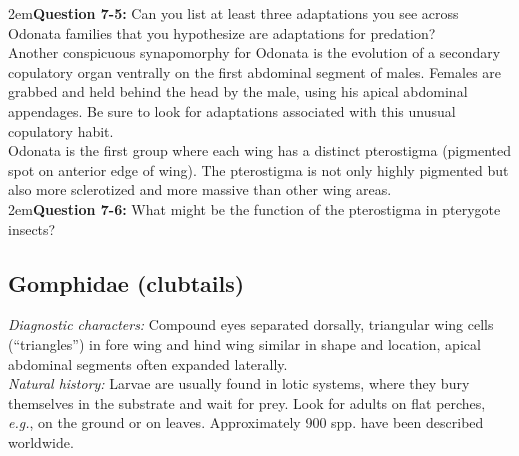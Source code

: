 \documentclass[letterpaper, 11pt]{article}
\begin{document}
\hangindent2em\textbf{Question 7-5:} Can you list at least three adaptations you see across Odonata families that you hypothesize are adaptations for predation?\\

\noindent{}Another conspicuous synapomorphy for Odonata is the evolution of a secondary copulatory organ ventrally on the first abdominal segment of males. Females are grabbed and held behind the head by the male, using his apical abdominal appendages. Be sure to look for adaptations associated with this unusual copulatory habit.\\

\noindent{}Odonata is the first group where each wing has a distinct pterostigma (pigmented spot on anterior edge of wing). The pterostigma is not only highly pigmented but also more sclerotized and more massive than other wing areas. \\

\hangindent2em\textbf{Question 7-6:} What might be the function of the pterostigma in pterygote insects?\\

\subsection{Gomphidae (clubtails)}
\noindent{}\textit{Diagnostic characters:} Compound eyes separated dorsally, triangular wing cells (``triangles'') in fore wing and hind wing similar in shape and location, apical abdominal segments often expanded laterally.\\

\noindent{}\textit{Natural history:} Larvae are usually found in lotic systems, where they bury themselves in the substrate and wait for prey. Look for adults on flat perches, \textit{e.g.}, on the ground or on leaves. Approximately 900 spp. have been described worldwide.
\end{document}

